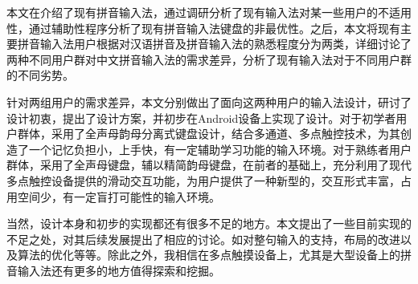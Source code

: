 
本文在介绍了现有拼音输入法，通过调研分析了现有输入法对某一些用户的不适用性，通过辅助性程序分析了现有拼音输入法键盘的非最优性。之后，本文将现有主要拼音输入法用户根据对汉语拼音及拼音输入法的熟悉程度分为两类，详细讨论了两种不同用户群对中文拼音输入法的需求差异，分析了现有输入法对于不同用户群的不同劣势。

针对两组用户的需求差异，本文分别做出了面向这两种用户的输入法设计，研讨了设计初衷，提出了设计方案，并初步在Android设备上实现了设计。对于初学者用户群体，采用了全声母韵母分离式键盘设计，结合多通道、多点触控技术，为其创造了一个记忆负担小，上手快，有一定辅助学习功能的输入环境。对于熟练者用户群体，采用了全声母键盘，辅以精简韵母键盘，在前者的基础上，充分利用了现代多点触控设备提供的滑动交互功能，为用户提供了一种新型的，交互形式丰富，占用空间少，有一定盲打可能性的输入环境。

当然，设计本身和初步的实现都还有很多不足的地方。本文提出了一些目前实现的不足之处，对其后续发展提出了相应的讨论。如对整句输入的支持，布局的改进以及算法的优化等等。除此之外，我相信在多点触摸设备上，尤其是大型设备上的拼音输入法还有更多的地方值得探索和挖掘。
